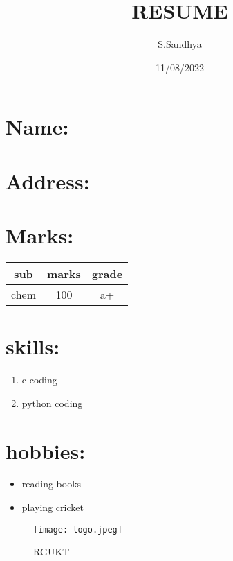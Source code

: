 \documentclass{article}
\title{RESUME}
\author{S.Sandhya}
\date{11/08/2022}
\begin{document}
\maketitle
\section{\bf{Name}:
}
\section{Address:
\it{\color{red}{telangana}}}
\section{Marks:}
\begin{center}
    \begin{tabular}{|c|c|c|}
    \hline
         sub&marks&grade\\
         \hline
         chem&100&a+\\
         \hline
    \end{tabular}
\end{center}
\section{skills:}
\begin{enumerate}
    \item c coding
    \item python coding
\end{enumerate}
\section{hobbies:}
\begin{itemize}
    \item reading books
    \item playing cricket
\end{itemize}
\begin{figure}
    \centering
    \texttt{[image: logo.jpeg]}
    \caption{RGUKT}
    \label{fig:my_label}
\end{figure}
\end{document}
